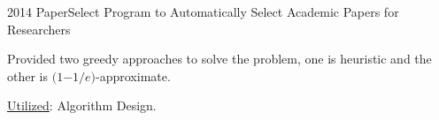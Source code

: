\begin{cventries}
	\cvprojectentry
	{2014 PaperSelect} %
	{Program to Automatically Select Academic Papers for Researchers} %
	{
		\begin{cvitems} %
			\item Provided two greedy approaches to solve the problem, one is heuristic and the other is $(1$$-$$1/e)$-approximate. 
			\item  \underline{Utilized}: Algorithm Design.	
		\end{cvitems}
	}
	
	
\end{cventries}
